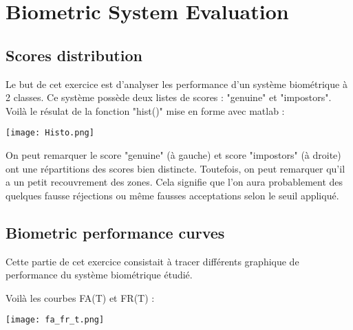 
\chapter{Biometric System Evaluation} %

\label{Chapitre 4.1} %


\section{Scores distribution}

Le but de cet exercice est d'analyser les performance d'un système biométrique à 2 classes. Ce système possède deux listes de scores : "genuine" et "impostors".  \\

Voilà le résulat de la fonction "hist()" mise en forme avec matlab : 

\begin{center} 
\hspace{15cm}
\texttt{[image: Histo.png]}
\end{center}
\vspace{1cm} 

On peut remarquer le score "genuine" (à gauche) et score "impostors" (à droite) ont une répartitions des scores bien distincte. Toutefois, on peut remarquer qu'il a un petit recouvrement des zones. Cela signifie que l'on aura probablement des quelques fausse réjections ou même fausses acceptations selon le seuil appliqué.
\pagebreak


\section{Biometric performance curves}

Cette partie de cet exercice consistait à tracer différents graphique de performance du système biométrique étudié. 

Voilà les courbes FA(T) et FR(T) :

\begin{center} 
\hspace{15cm}
\texttt{[image: fa\_fr\_t.png]}
\end{center}
\vspace{1cm} 

